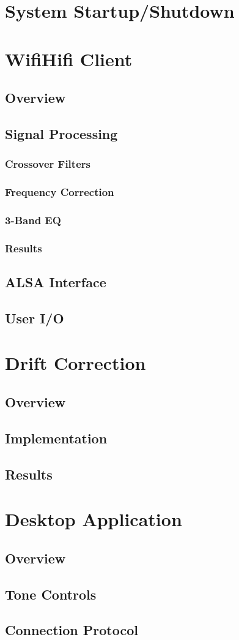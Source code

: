 \documentclass[main.tex]{subfiles}
\begin{document}
\section{System Startup/Shutdown}

\section{WifiHifi Client}
\subsection{Overview}
\subsection{Signal Processing}
\subsubsection{Crossover Filters}
\subsubsection{Frequency Correction}
\subsubsection{3-Band EQ}
\subsubsection{Results}
\subsection{ALSA Interface}
\subsection{User I/O}

\section{Drift Correction}
\subsection{Overview}
\subsection{Implementation}
\subsection{Results}

\section{Desktop Application}
\subsection{Overview}
\subsection{Tone Controls}
\subsection{Connection Protocol}
\end{document}
